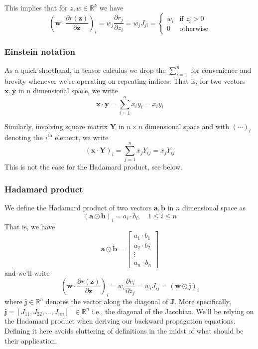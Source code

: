 \documentclass[varwidth,border=2cm]{standalone}
\begin{document}
This implies that for $z, w \in \mathbb{R}^k$ we have
\begin{equation}
\left(\bm w \cdot \frac{\partial r(\bm z)}{\partial \bm z}\right)_i = w_j\frac{\partial r_j}{\partial z_i} = w_j J_{ji} = \begin{cases}
w_i &\text{if } z_i > 0 \\
0 &\text{otherwise}
\end{cases}
\label{w_dot_j}
\end{equation}

\subsubsection{Einstein notation}
As a quick shorthand, in tensor calculus we drop the $\sum _{i=1} ^n$ for convenience and brevity whenever we're operating on repeating indices. That is, for two vectors $\bm x, \bm y$ in $n$ dimensional space, we write
\[
\bm x \cdot \bm y = \displaystyle \sum _{i=1} ^n x_i y_i = x_i y_i
\]

Similarly, involving square matrix $\bm Y$ in $n\times n$ dimensional space and with $(\cdots)_i$ denoting the $i^{\text{th}}$ element, we write
\[
(\bm x \cdot \bm Y)_i = \displaystyle \sum _{j=1} ^n x_jY_{ij} = x_jY_{ij}
\]
This is not the case for the Hadamard product, see below.

\subsubsection{Hadamard product}
We define the Hadamard product of two vectors $\bm a, \bm b$ in $n$ dimensional space as
\[
(\bm{a} \odot \bm{b})_i = a_i \cdot b_i, \quad 1 \le i \le n
\]
That is, we have
\[
\bm{a} \odot \bm{b} =
\begin{bmatrix}
a_1 \cdot b_1 \\
a_2 \cdot b_2 \\
\vdots \\
a_n \cdot b_n
\end{bmatrix}
\]
and we'll write
\begin{equation}
\left(\bm w \cdot \frac{\partial r(\bm z)}{\partial \bm z}\right)_i = w_i\frac{\partial r_i}{\partial z_j} = w_i J_{ij} = \left( \bm w \odot \bm j\right) _i
\label{w_dot_drelu}
\end{equation}
where $\bm j \in \mathbb{R}^n$ denotes the vector along the diagonal of $\bm J$. More specifically,
\( \bm j = [J_{11}, J_{22}, \dots, J_{nn}]^\top \in \mathbb{R}^n \) i.e., the diagonal of the Jacobian. We'll be relying on the Hadamard product when deriving our backward propagation equations. Defining it here avoids cluttering of definitions in the midst of what should be their application.
\end{document}
